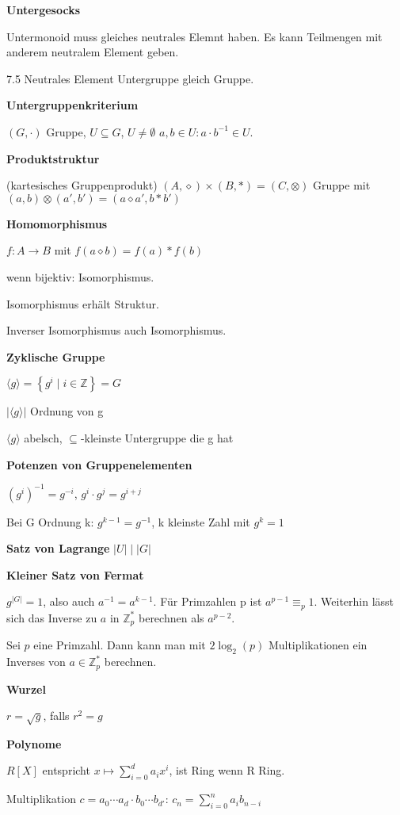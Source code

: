 \documentclass[a4paper,10pt]{article}
\newcommand{\integers}{\mathbb{Z}}
\newcommand{\set}[2]{\left\{#1 \mid #2\right\}}
\begin{document}
\begin{multicols}{3}
\textbf{Untergesocks}

Untermonoid muss gleiches neutrales Elemnt haben. Es kann Teilmengen mit anderem neutralem Element geben.

7.5 Neutrales Element Untergruppe gleich Gruppe.

\textbf{Untergruppenkriterium}

$(G,\cdot)$ Gruppe, $U\subseteq G$, $U\neq \emptyset$ $a,b\in U: a\cdot b^{-1}\in U$.

\textbf{Produktstruktur}

(kartesisches Gruppenprodukt) $(A,\diamond) \times (B,\ast) = (C,\otimes)$ Gruppe mit $(a,b) \otimes (a',b') = (a \diamond a',b \ast b')$

\textbf{Homomorphismus}

$f: A \to B$ mit $f(a \diamond b) = f(a) \ast f(b)$

wenn bijektiv: Isomorphismus.

Isomorphismus erhält Struktur.

Inverser Isomorphismus auch Isomorphismus.

\textbf{Zyklische Gruppe}

$\langle g \rangle = \set{g^i}{i \in \integers} = G$

$|\langle g \rangle|$ Ordnung von g

$\langle g \rangle$ abelsch, $\subseteq$-kleinste Untergruppe die g hat

\textbf{Potenzen von Gruppenelementen}

$(g^i)^{-1} = g^{-i}$, $g^i \cdot g^j = g^{i+j}$

Bei G Ordnung k: $g^{k-1} = g^{-1}$, k kleinste Zahl mit $g^k=1$

\textbf{Satz von Lagrange} $|U|\;|\;|G|$

\textbf{Kleiner Satz von Fermat}

$g^{|G|} = 1$, also auch $a^{-1} = a^{k-1}$. Für Primzahlen p ist $a^{p-1} \equiv_p 1$. Weiterhin lässt sich das Inverse zu $a$ in $\integers_p^*$ berechnen als $a^{p-2}$.

Sei $p$ eine Primzahl. Dann kann man mit $2 \log_2(p)$ Multiplikationen ein Inverses von $a \in \integers_p^*$ berechnen.

\textbf{Wurzel}

$r = \sqrt{g}$, falls $r^2 = g$

\textbf{Polynome}

$R[X]$ entspricht $x \mapsto \sum_{i=0}^d a_i x^i$, ist Ring wenn R Ring.

Multiplikation $c=a_0\cdots a_d \cdot b_0\cdots b_{d'}$: $c_n = \sum_{i=0}^n a_i b_{n-i}$


\end{multicols}
\end{document}
